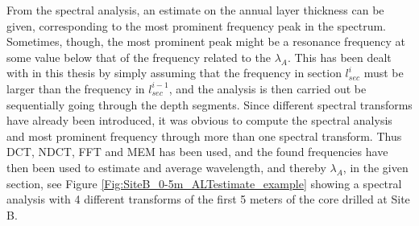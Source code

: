 \documentclass[../../CompleteThesis2/Complete_2ndDraft]{subfiles}
\begin{document}
From the spectral analysis, an estimate on the annual layer thickness can be given, corresponding to the most prominent frequency peak in the spectrum. Sometimes, though, the most prominent peak might be a resonance frequency at some value below that of the frequency related to the $\lambda_A$. This has been dealt with in this thesis by simply assuming that the frequency in section $l_{sec}^i$ must be larger than the frequency in $l_{sec}^{i-1}$, and the analysis is then carried out be sequentially going through the depth segments. Since different spectral transforms have already been introduced, it was obvious to compute the spectral analysis and most prominent frequency through more than one spectral transform. Thus DCT, NDCT, FFT and MEM has been used, and the found frequencies have then been used to estimate and average wavelength, and thereby $\lambda_A$, in the given section, see Figure \ref{Fig:SiteB_0-5m_ALTestimate_example} showing a spectral analysis with 4 different transforms of the first 5 meters of the core drilled at Site B.
\end{document}
